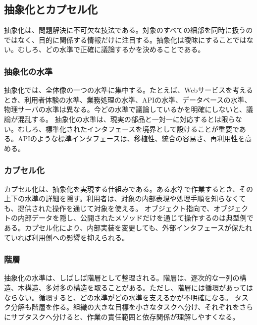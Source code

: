 \subsection{抽象化とカプセル化}
抽象化は、問題解決に不可欠な技法である。対象のすべての細部を同時に扱うのではなく、目的に関係する情報だけに注目する。抽象化は曖昧にすることではない。むしろ、どの水準で正確に議論するかを決めることである。
\subsubsection{抽象化の水準}
抽象化では、全体像の一つの水準に集中する。たとえば、Webサービスを考えるとき、利用者体験の水準、業務処理の水準、APIの水準、データベースの水準、物理サーバの水準は異なる。今どの水準で議論しているかを明確にしないと、議論が混乱する。
抽象化の水準は、現実の部品と一対一に対応するとは限らない。むしろ、標準化されたインタフェースを境界として設けることが重要である。APIのような標準インタフェースは、移植性、統合の容易さ、再利用性を高める。
\subsubsection{カプセル化}
カプセル化は、抽象化を実現する仕組みである。ある水準で作業するとき、その上下の水準の詳細を隠す。利用者は、対象の内部表現や処理手順を知らなくても、提供された操作を通じて対象を使える。
オブジェクト指向で、オブジェクトの内部データを隠し、公開されたメソッドだけを通じて操作するのは典型例である。カプセル化により、内部実装を変更しても、外部インタフェースが保たれていれば利用側への影響を抑えられる。
\subsubsection{階層}
抽象化の水準は、しばしば階層として整理される。階層は、逐次的な一列の構造、木構造、多対多の構造を取ることがある。ただし、階層には循環があってはならない。循環すると、どの水準がどの水準を支えるかが不明確になる。
タスク分解も階層を作る。組織の大きな目標を小さなタスクへ分け、それぞれをさらにサブタスクへ分けると、作業の責任範囲と依存関係が理解しやすくなる。
